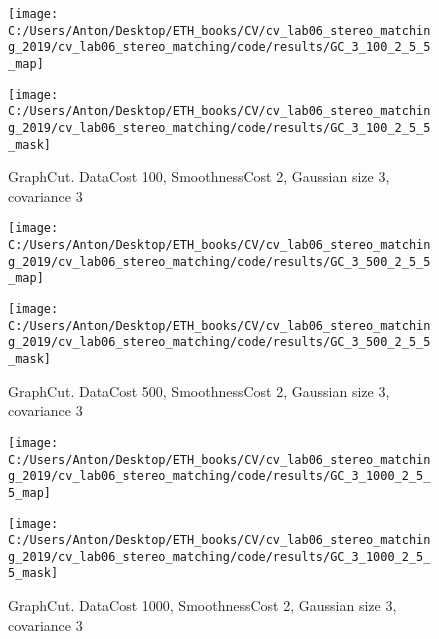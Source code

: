 \documentclass{report}
\begin{document}
\begin{figure}[h]
	\begin{center}
		\begin{minipage}[h]{0.45\linewidth}
			\texttt{[image: C:/Users/Anton/Desktop/ETH\_books/CV/cv\_lab06\_stereo\_matching\_2019/cv\_lab06\_stereo\_matching/code/results/GC\_3\_100\_2\_5\_5\_map]}
		\end{minipage}
		\hfill
		\begin{minipage}[h]{0.45\linewidth}
			\texttt{[image: C:/Users/Anton/Desktop/ETH\_books/CV/cv\_lab06\_stereo\_matching\_2019/cv\_lab06\_stereo\_matching/code/results/GC\_3\_100\_2\_5\_5\_mask]}			
		\end{minipage}
		\caption{GraphCut. DataCost 100, SmoothnessCost 2, Gaussian size 3, covariance 3}
	\end{center}
\end{figure}
\begin{figure}[h]
	\begin{center}
		\begin{minipage}[h]{0.45\linewidth}
			\texttt{[image: C:/Users/Anton/Desktop/ETH\_books/CV/cv\_lab06\_stereo\_matching\_2019/cv\_lab06\_stereo\_matching/code/results/GC\_3\_500\_2\_5\_5\_map]}
		\end{minipage}
		\hfill
		\begin{minipage}[h]{0.45\linewidth}
			\texttt{[image: C:/Users/Anton/Desktop/ETH\_books/CV/cv\_lab06\_stereo\_matching\_2019/cv\_lab06\_stereo\_matching/code/results/GC\_3\_500\_2\_5\_5\_mask]}			
		\end{minipage}
	\caption{GraphCut. DataCost 500, SmoothnessCost 2, Gaussian size 3, covariance 3}
	\end{center}
\end{figure}
\begin{figure}[h]
	\begin{center}
		\begin{minipage}[h]{0.45\linewidth}
			\texttt{[image: C:/Users/Anton/Desktop/ETH\_books/CV/cv\_lab06\_stereo\_matching\_2019/cv\_lab06\_stereo\_matching/code/results/GC\_3\_1000\_2\_5\_5\_map]}
		\end{minipage}
		\hfill
		\begin{minipage}[h]{0.45\linewidth}
			\texttt{[image: C:/Users/Anton/Desktop/ETH\_books/CV/cv\_lab06\_stereo\_matching\_2019/cv\_lab06\_stereo\_matching/code/results/GC\_3\_1000\_2\_5\_5\_mask]}			
		\end{minipage}
		\caption{GraphCut. DataCost 1000, SmoothnessCost 2, Gaussian size 3, covariance 3}
	\end{center}
\end{figure}
\end{document}
